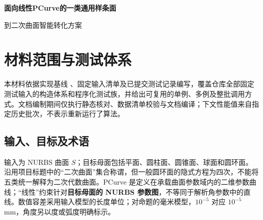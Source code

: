 \documentclass[UTF8,zihao=5,fontset=windows,a4paper]{ctexart}
\newcommand{\code}[1]{\texttt{\detokenize{#1}}}
\begin{document}
\thispagestyle{first}
\begin{center}
{\fontsize{18}{25}\selectfont\bfseries\color{ink}面向线性PCurve的一类通用样条面\par 到二次曲面智能转化方案\par}
\vspace{5pt}{\large 测试材料说明}\par
{}
\end{center}
\section{材料范围与测试体系}
本材料依据实现基线 \code{70e03d1}、固定输入清单及已提交测试记录编写，覆盖仓库全部固定测试输入的构造体系和程序化测试族，并给出可复用的单例、多例及整批调用方式。文档编制期间仅执行静态核对、数据清单校验与文档编译；下文性能值来自指定历史批次，不表示重新运行了算法。

\subsection{输入、目标及术语}
输入为 NURBS 曲面 $S$；目标母面包括平面、圆柱面、圆锥面、球面和圆环面。沿用项目标题中的“二次曲面”集合称谓，但一般圆环面的隐式方程为四次，不能将五类统一解释为二次代数曲面。PCurve 是定义在承载曲面参数域内的二维参数曲线；“线性”约束针对\textbf{目标母面的 NURBS 参数图}，不等同于解析角参数中的直线。数值容差采用输入模型的长度单位；对命题的毫米模型，$10^{-5}$ 对应 $10^{-5}$ mm，角度另以度或弧度明确标示。
\end{document}
